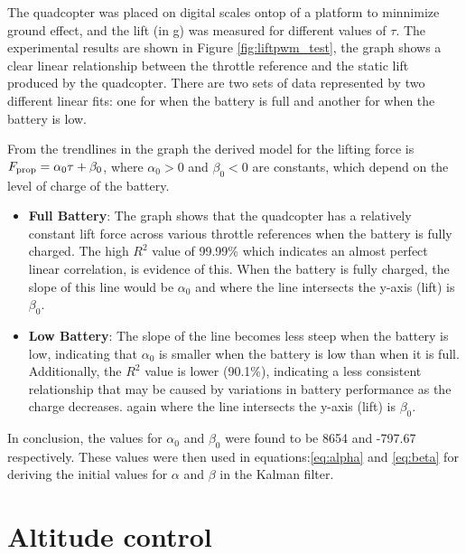 \documentclass{report}
\begin{document}
The quadcopter was placed on digital scales ontop of a platform to minnimize
ground effect, and the lift (in g) was measured for different values of
\(\tau\). The experimental results are shown in Figure \ref{fig:liftpwm_test},
the graph shows a clear linear relationship between the throttle reference and
the static lift produced by the quadcopter. There are two sets of data
represented by two different linear fits: one for when the battery is full and
another for when the battery is low.

From the trendlines in the graph the derived model for the lifting force is
\(F_{\rm prop} = \alpha_0 \tau + \beta_0\), where $\alpha_0>0$ and $\beta_0<0$
are constants, which depend on the level of charge of the battery.

\begin{itemize}
  \item \textbf{Full Battery}: The graph shows that the quadcopter has a
    relatively constant lift force across various throttle references when the
    battery is fully charged. The high \(R^2\) value of 99.99\% which indicates
    an almost perfect linear correlation, is evidence of this. When the battery
    is fully charged, the slope of this line would be \(\alpha_0\) and where the
    line intersects the y-axis (lift) is \(\beta_0\).
  \item \textbf{Low Battery}: The slope of the line becomes less steep when the
    battery is low, indicating that \(\alpha_0\) is smaller when the battery is
    low than when it is full. Additionally, the \(R^2\) value is lower (90.1\%),
    indicating a less consistent relationship that may be caused by variations
    in battery performance as the charge decreases. again where the line
    intersects the y-axis (lift) is \(\beta_0\).
\end{itemize}
In conclusion, the values for \(\alpha_0\) and \(\beta_0\) were found to be 8654
and -797.67 respectively. These values were then used in
equations:\ref{eq:alpha} and \ref{eq:beta} for deriving the initial values for
\(\alpha\) and \(\beta\) in the Kalman filter.

\section{Altitude control}\label{altitude_cotrol_tests}
\end{document}
